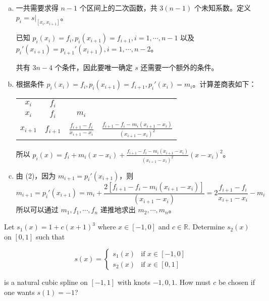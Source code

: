 \documentclass[lang=cn,a4paper,newtx,bibend=bibtex]{elegantpaper}
\begin{document}
\begin{solution} ~~%

\begin{enumerate}[(a)]
  \item 一共需要求得 $n-1$ 个区间上的二次函数，共 $3(n-1)$ 个未知系数。定义 $p_i = s\big|_{[x_i, x_{i+1}]}$。
  
  已知 $p_{i}(x_i) = f_i, p_{i}(x_{i+1}) = f_{i+1},i = 1, \cdots, n-1$ 以及 $p_{i}'(x_{i+1}) = p_{i+1}'(x_{i+1}), i = 1, \cdots, n-2$。

  共有 $3n-4$ 个条件，因此要唯一确定 $s$ 还需要一个额外的条件。
  \item 根据条件 $p_i(x_i) = f_i, p_i(x_{i+1}) = f_{i+1}, p_i'(x_i) = m_i$。计算差商表如下：
  
  \begin{tabular}{c|ccc}
    &&& \\
    \hline
    \textbf{$x_i$} & $f_i$ & &  \\
    \textbf{$x_i$} & $f_i$ & $m_i$  &  \\
    \textbf{$x_{i+1}$} & $f_{i+1}$ & $\frac{f_{i+1} - f_i}{x_{i+1} - x_i}$ & $\frac{f_{i+1} - f_i - m_i(x_{i+1} - x_i)}{(x_{i+1} - x_i)^2}$ \\
  \end{tabular}
  所以 $p_i(x) = f_i + m_i(x - x_i) + \frac{f_{i+1} - f_i - m_i(x_{i+1} - x_i)}{(x_{i + 1} - x_i)^2}(x - x_i)^2 $。
  \item 由 (2)，因为 $m_{i + 1} = p_i'(x_{i+1})$，则
  \[m_{i + 1} = p_i'(x_{i+1}) = m_i + \frac{2[f_{i + 1} - f_i - m_i(x_{i + 1} - x_i)]}{(x_{i + 1} - x_i)} = 2\frac{f_{i +1} - f_i}{x_{i + 1} - x_i} - m_i\]
  所以可以通过 $m_1, f_1, \cdots, f_{n}$ 递推地求出 $m_2, \cdots, m_n$。
\end{enumerate}
\end{solution}

\begin{prob}
  Let $s_1(x)=1+c(x+1)^3$ where $x\in[-1,0]$ and $c\in \mathbb{R}$. Determine $s_2(x)$ on $[0,1]$ such that
  
  \begin{equation*}
    s(x)=\begin{cases} s_1(x) & \text{if~} x\in[-1,0]\\ s_2(x) & \text{if~} x\in [0,1]\end{cases}
  \end{equation*}
  
  is a natural cubic spline on $[-1,1]$ with knots $-1,0,1$. How must $c$ be chosen if one wants $ s(1) = -1$?
\end{prob}
\end{document}
